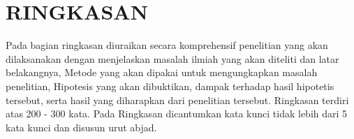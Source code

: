 \chapter*{RINGKASAN}
Pada bagian ringkasan diuraikan secara komprehensif penelitian yang akan dilaksanakan dengan menjelaskan masalah ilmiah yang akan diteliti dan latar belakangnya, Metode yang akan dipakai untuk mengungkapkan masalah penelitian, Hipotesis yang akan dibuktikan, dampak terhadap hasil hipotetis tersebut, serta hasil yang diharapkan dari penelitian tersebut. Ringkasan terdiri atas 200 - 300 kata. Pada Ringkasan dicantumkan kata kunci tidak lebih dari 5 kata kunci dan disusun urut abjad.